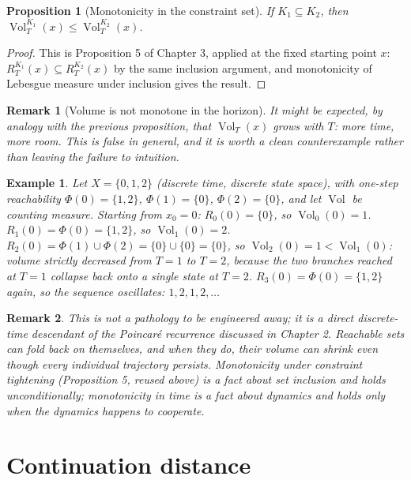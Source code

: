 \documentclass[11pt]{report}
\newtheorem{proposition}{Proposition}[chapter]
\newtheorem{remark}{Remark}[chapter]
\newtheorem{example}{Example}[chapter]
\begin{document}
\begin{proposition}[Monotonicity in the constraint set]
If $K_1 \subseteq K_2$, then $\operatorname{Vol}_T^{K_1}(x) \leq \operatorname{Vol}_T^{K_2}(x)$.
\end{proposition}
\begin{proof}
This is Proposition 5 of Chapter 3, applied at the fixed starting point
$x$: $R_T^{K_1}(x) \subseteq R_T^{K_2}(x)$ by the same inclusion
argument, and monotonicity of Lebesgue measure under inclusion gives
the result.
\end{proof}

\begin{remark}[Volume is not monotone in the horizon]
It might be expected, by analogy with the previous proposition, that
$\operatorname{Vol}_T(x)$ grows with $T$: more time, more room. This is
false in general, and it is worth a clean counterexample rather than
leaving the failure to intuition.
\end{remark}

\begin{example}
Let $X = \{0,1,2\}$ (discrete time, discrete state space), with
one-step reachability $\Phi(0) = \{1,2\}$, $\Phi(1) = \{0\}$,
$\Phi(2) = \{0\}$, and let $\operatorname{Vol}$ be counting measure.
Starting from $x_0 = 0$: $R_0(0) = \{0\}$, so
$\operatorname{Vol}_0(0) = 1$. $R_1(0) = \Phi(0) = \{1,2\}$, so
$\operatorname{Vol}_1(0) = 2$. $R_2(0) = \Phi(1) \cup \Phi(2) = \{0\} \cup \{0\} = \{0\}$,
so $\operatorname{Vol}_2(0) = 1 < \operatorname{Vol}_1(0)$: volume
strictly \emph{decreased} from $T=1$ to $T=2$, because the two branches
reached at $T=1$ collapse back onto a single state at $T=2$.
$R_3(0) = \Phi(0) = \{1,2\}$ again, so the sequence oscillates:
$1, 2, 1, 2, \dots$
\end{example}

\begin{remark}
This is not a pathology to be engineered away; it is a direct
discrete-time descendant of the Poincar\'e recurrence discussed in
Chapter 2. Reachable sets can fold back on themselves, and when they
do, their volume can shrink even though every individual trajectory
persists. Monotonicity under constraint tightening (Proposition 5,
reused above) is a fact about set inclusion and holds unconditionally;
monotonicity in time is a fact about dynamics and holds only when the
dynamics happens to cooperate.
\end{remark}

\section*{Continuation distance}
\end{document}

